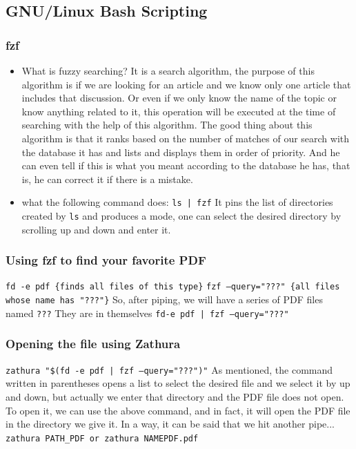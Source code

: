 \documentclass[12pt]{article}
\begin{document}
\newpage
\subsection{GNU/Linux Bash Scripting}


\subsubsection{fzf}
\begin{itemize}
  \item What is fuzzy searching?\newline
  It is a search algorithm, the purpose of this algorithm is if we are looking for an article and we know only one article that includes that discussion.
Or even if we only know the name of the topic or know anything related to it, this operation will be executed at the time of searching with the help of this algorithm.
The good thing about this algorithm is that it ranks based on the number of matches of our search with the database it has and lists and displays them in order of priority.
And he can even tell if this is what you meant according to the database he has, that is, he can correct it if there is a mistake.
\item what the following command does: \texttt{ls | fzf}\newline
It pins the list of directories created by \texttt{ls} and produces a mode, one can select the desired directory by scrolling up and down and enter it.
\end{itemize}



\subsubsection{Using fzf to find your favorite PDF}
\texttt{fd -e pdf \{finds all files of this type\}}\newline
\texttt{fzf --query="???" \{all files whose name has "???"\}}\newline
So, after piping, we will have a series of PDF files named \texttt{???} They are in themselves\newline
\texttt{fd-e pdf | fzf --query="???"}


\subsubsection{Opening the file using Zathura}
\texttt{zathura "\$(fd -e pdf | fzf --query="???")"} \newline
As mentioned, the command written in parentheses opens a list to select the desired file and we select it by up and down, but actually we enter that directory and the PDF file does not open.
To open it, we can use the above command, and in fact, it will open the PDF file in the directory we give it.
\newline
In a way, it can be said that we hit another pipe...
\newline
\texttt{zathura PATH\_PDF or zathura NAMEPDF.pdf}
\newpage
\end{document}
